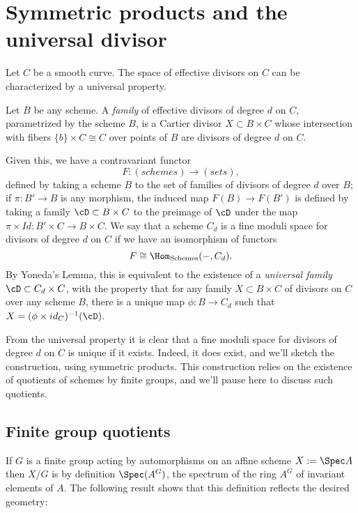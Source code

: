 \section{Symmetric products and the universal divisor}\label{symmetric section}

Let $C$ be a smooth curve. The space of effective divisors on $C$ can be characterized by a universal property. 

\begin{definition}
Let $B$ be any scheme. A \emph{family} of effective divisors of degree $d$ on $C$, parametrized by the scheme $B$, is a Cartier divisor $X\subset B\times C$ whose intersection with fibers $\{b\} \times C \cong C$ over points of $B$ are divisors of degree $d$ on $C$.
\end{definition}

Given this, we have a contravariant functor 
$$
F : (schemes) \to (sets),
$$
defined by taking a scheme $B$ to the set of families of divisors of degree $d$ over $B$; if $\pi : B' \to B$ is any morphism, the induced map $F(B) \to F(B')$ is defined by taking a family $\cD \subset B \times C$ to the preimage of $\cD$ under the map $\pi \times Id : B' \times C \to B \times C$. We say that a scheme $C_d$ is a fine moduli space for divisors of degree $d$ on $C$ if we have an isomorphism of functors
$$
F \cong \Hom_{\rm{Schemes}}( -, C_d).
$$
By Yoneda's Lemma, this is equivalent to the existence of a \emph{universal family} $\cD \subset C_d \times C$, with the property that for any family $X \subset B \times C$ of divisors on $C$ over any scheme $B$, there is a unique map $\phi : B \to C_d$ such that $X = (\phi \times id_{C})^{-1}(\cD)$.

From the universal property it is clear that a fine moduli space for divisors of degree $d$ on $C$ is unique if it exists. Indeed, it does exist, and we'll sketch the construction, using symmetric products. This construction relies on the existence of quotients of schemes by finite groups, and we'll pause here to discuss such quotients.

\subsection{Finite group quotients}

If $G$ is a finite group acting by automorphisms on an affine scheme $X:=\Spec A$ then $X/G$ is by definition $\Spec(A^G)$, the spectrum of the ring $A^G$ of invariant elements of $A$. The following result shows that this definition reflects the desired
geometry: 


